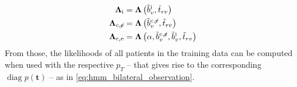 \documentclass[\relativeRoot/main.tex]{subfiles}
\begin{document}
%
\begin{equation}
    \begin{aligned}
        \boldsymbol{\Lambda}_\text{i} &= \boldsymbol{\Lambda} \left( \tilde{b}_v^\text{i} , \tilde{t}_{rv} \right) \\
        \boldsymbol{\Lambda}_{\text{c} , \centernot{\text{e}}} &= \boldsymbol{\Lambda}\left( \tilde{b}_v^{\text{c} , \centernot{e}} , \tilde{t}_{rv} \right) \\
        \boldsymbol{\Lambda}_{\text{c} , \text{e}} &= \boldsymbol{\Lambda} \left( \alpha , \tilde{b}_v^{\text{c} , \centernot{e}} , \tilde{b}_v^\text{i} , \tilde{t}_{rv} \right)
    \end{aligned}
\end{equation}
%
From those, the likelihoods of all patients in the training data can be computed when used with the respective $p_T$ -- that gives rise to the corresponding $\operatorname{diag}{p(\mathbf{t})}$ -- as in \cref{eq:hmm_bilateral_observation}.
\end{document}
